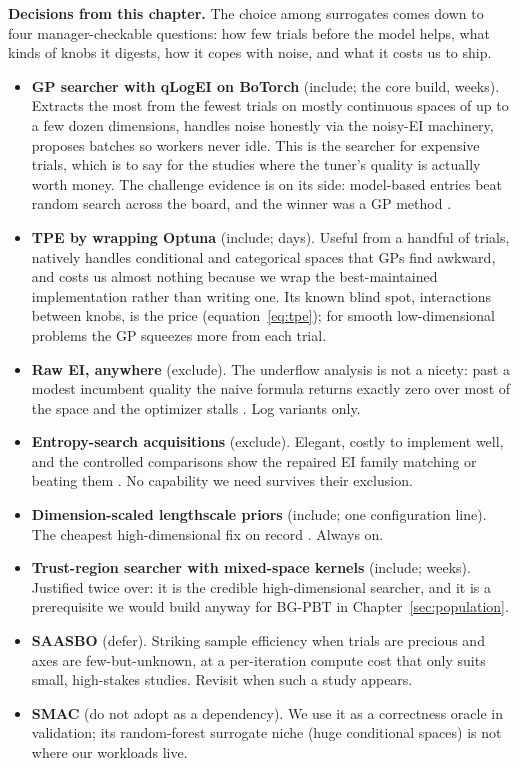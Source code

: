 \begin{decisions}
\noindent\textbf{Decisions from this chapter.} The choice among
surrogates comes down to four manager-checkable questions: how few
trials before the model helps, what kinds of knobs it digests, how it
copes with noise, and what it costs us to ship.
\begin{itemize}[leftmargin=1.3em, itemsep=2pt]
\item \textbf{GP searcher with qLogEI on BoTorch} (include; the core
build, weeks). Extracts the most from the fewest trials on mostly
continuous spaces of up to a few dozen dimensions, handles noise
honestly via the noisy-EI machinery, proposes batches so workers never
idle. This is the searcher for expensive trials, which is to say for
the studies where the tuner's quality is actually worth money. The
challenge evidence is on its side: model-based entries beat random
search across the board, and the winner was a GP method
\citep{turner2021bayesian, cowenrivers2022hebo}.
\item \textbf{TPE by wrapping Optuna} (include; days). Useful from a
handful of trials, natively handles conditional and categorical spaces
that GPs find awkward, and costs us almost nothing because we wrap the
best-maintained implementation rather than writing one. Its known
blind spot, interactions between knobs, is the price
(equation~\ref{eq:tpe}); for smooth low-dimensional problems the GP
squeezes more from each trial.
\item \textbf{Raw EI, anywhere} (exclude). The underflow analysis is
not a nicety: past a modest incumbent quality the naive formula returns
exactly zero over most of the space and the optimizer stalls
\citep{ament2023logei}. Log variants only.
\item \textbf{Entropy-search acquisitions} (exclude). Elegant, costly
to implement well, and the controlled comparisons show the repaired EI
family matching or beating them \citep{ament2023logei}. No capability
we need survives their exclusion.
\item \textbf{Dimension-scaled lengthscale priors} (include;
one configuration line). The cheapest high-dimensional fix on record
\citep{hvarfner2024vanilla}. Always on.
\item \textbf{Trust-region searcher with mixed-space kernels}
(include; weeks). Justified twice over: it is the credible
high-dimensional searcher, and it is a prerequisite we would build
anyway for BG-PBT in Chapter~\ref{sec:population}.
\item \textbf{SAASBO} (defer). Striking sample efficiency when trials
are precious and axes are few-but-unknown, at a per-iteration compute
cost that only suits small, high-stakes studies. Revisit when such a
study appears.
\item \textbf{SMAC} (do not adopt as a dependency). We use it as a
correctness oracle in validation; its random-forest surrogate niche
(huge conditional spaces) is not where our workloads live.
\end{itemize}
\end{decisions}

